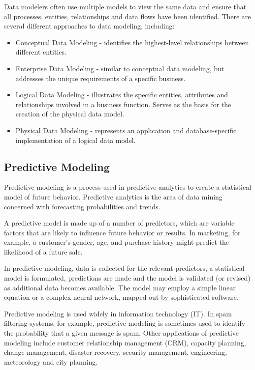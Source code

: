 \documentclass[]{report}
\begin{document}
Data modelers often use multiple models to view the same data and ensure that all processes, entities, relationships and data flows have been identified. There are several different approaches to data modeling, including:
\begin{itemize}
\item  Conceptual Data Modeling - identifies the highest-level relationships between different entities.

\item  Enterprise Data Modeling - similar to conceptual data modeling, but addresses the unique requirements of a specific business. 

\item  Logical Data Modeling - illustrates the specific entities, attributes and relationships involved in a business function. Serves as the basis for the creation of the physical data model.

\item  Physical Data Modeling - represents an application and database-specific implementation of a logical data model.
    \end{itemize}
    \subsection*{ Predictive Modeling }
Predictive modeling is a process used in predictive analytics to create a statistical model of future behavior. Predictive analytics is the area of data mining concerned with forecasting probabilities and trends.

A predictive model is made up of a number of predictors, which are variable factors that are likely to influence future behavior or results. In marketing, for example, a customer's gender, age, and purchase history might predict the likelihood of a future sale.

In predictive modeling, data is collected for the relevant predictors, a statistical model is formulated, predictions are made and the model is validated (or revised) as additional data becomes available. The model may employ a simple linear equation or a complex neural network, mapped out by sophisticated software.

Predictive modeling is used widely in information technology (IT). In spam filtering systems, for example, predictive modeling is sometimes used to identify the probability that a given message is spam. Other applications of predictive modeling include customer relationship management (CRM), capacity planning, change management, disaster recovery, security management, engineering, meteorology and city planning.
\end{document}
